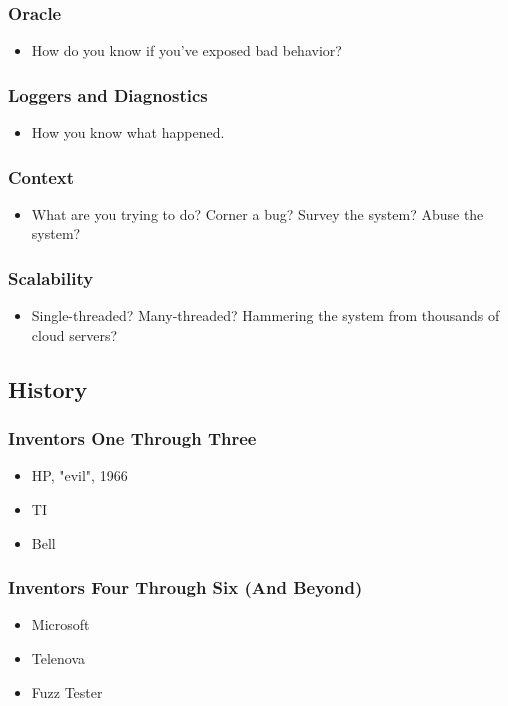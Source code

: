 \begin{frame}
  \frametitle{Oracle}
  \begin{itemize}
    \item How do you know if you've exposed bad behavior?
  \end{itemize}
\end{frame}

\begin{frame}
  \frametitle{Loggers and Diagnostics}
  \begin{itemize}
    \item How you know what happened.
  \end{itemize}
\end{frame}

\begin{frame}
  \frametitle{Context}
  \begin{itemize}
    \item What are you trying to do? Corner a bug? Survey the system? Abuse the system?
  \end{itemize}
\end{frame}

\begin{frame}
  \frametitle{Scalability}
  \begin{itemize}
    \item Single-threaded? Many-threaded? Hammering the system from thousands of cloud servers?
  \end{itemize}\cite{parveen2010migrate}
\end{frame}

\subsection{History}

\begin{frame}
  \frametitle{Inventors One Through Three}
  \begin{itemize}
    \item HP, "evil", 1966
    \item TI
    \item Bell
  \end{itemize}
\end{frame}

\begin{frame}
  \frametitle{Inventors Four Through Six (And Beyond)}
  \begin{itemize}
    \item Microsoft
    \item Telenova
    \item Fuzz Tester \citep{miller1989TR830}
  \end{itemize}
\end{frame}

